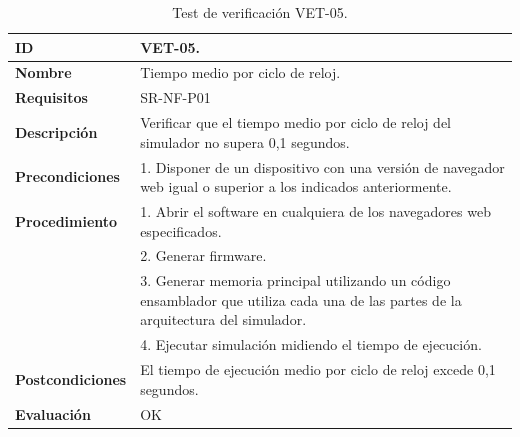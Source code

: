 \begin{center}
\begin{table}[htb]
\centering
\begin{tabular}{@{}p{2.5cm} p{13cm}@{}} 
\toprule
\textbf{ID} 					& VET-05. \\
\midrule
\textbf{Nombre} 				& Tiempo medio por ciclo de reloj. \\
\midrule
\textbf{Requisitos} 		& SR-NF-P01\\
\midrule
\textbf{Descripción} 		& Verificar que el tiempo medio por ciclo de reloj del simulador no supera 0,1 segundos. \\
\midrule
\textbf{Precondiciones}		& 1. Disponer de un dispositivo con una versión de navegador web igual o superior a los indicados anteriormente. \\
\midrule
\textbf{Procedimiento}			& 1. Abrir el software en cualquiera de los navegadores web especificados. \\
							& 2. Generar firmware.\\
							& 3. Generar memoria principal utilizando un código ensamblador que utiliza cada una de las partes de la arquitectura del simulador.\\
							& 4. Ejecutar simulación midiendo el tiempo de ejecución.\\
\midrule
\textbf{Postcondiciones} 		&  El tiempo de ejecución medio por ciclo de reloj excede 0,1 segundos.\\
\midrule
\textbf{Evaluación} 			& OK \\
\bottomrule
\end{tabular}
\caption{Test de verificación VET-05.}
\label{tab:vet05}
\end{table}
\end{center}

